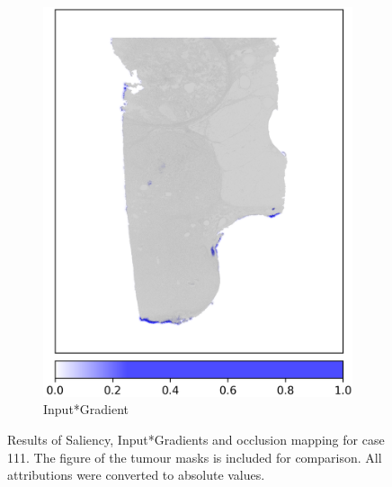 \begin{figure}[h!t]
\begin{subfigure}[b]{0.49\textwidth}
         \includegraphics[width=\textwidth]{latex/captum/case111/inputXgradient_pos_case111-stain1-censored_3499days.png}
         \caption{Input*Gradient}
     \end{subfigure}
  
    \hfill
    \caption[Occlusion and Saliency for case 111]{Results of Saliency, Input*Gradients and occlusion mapping for case 111. The figure of the tumour masks is included for comparison. All attributions were converted to absolute values.}
    \label{fig:case111b}
\end{figure}


